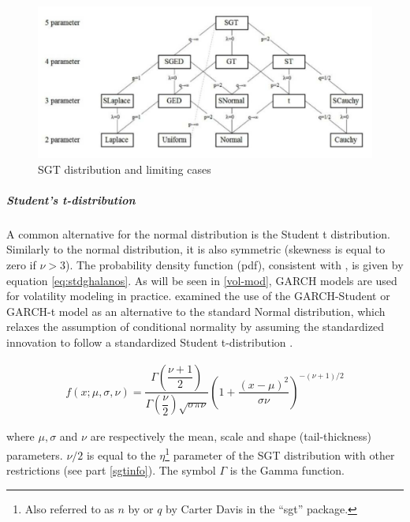 \documentclass[a4paper, nobind]{templates/ociamthesis}
\begin{document}
\begin{figure}

{\centering \includegraphics[width=1\linewidth]{front-and-back-matter/images/SGT} 

}

\caption{SGT distribution and limiting cases}\label{fig:figure}
\end{figure}

\hypertarget{students-t-distribution}{%
\subparagraph{Student's t-distribution}\label{students-t-distribution}}

\noindent A common alternative for the normal distribution is the Student t distribution. Similarly to the normal distribution, it is also symmetric (skewness is equal to zero if \(\nu > 3\)). The probability density function (pdf), consistent with \textcite{ghalanos2020}, is given by equation \eqref{eq:stdghalanos}. As will be seen in \ref{vol-mod}, GARCH models are used for volatility modeling in practice. \textcite{bollerslev1987} examined the use of the GARCH-Student or GARCH-t model as an alternative to the standard Normal distribution, which relaxes the assumption of conditional normality by assuming the standardized innovation to follow a standardized Student t-distribution \autocite{bollerslev2008}.

\begin{align}
f(x; \mu, \sigma,\nu) = \dfrac{\Gamma(\dfrac{\nu+1}{2})}{\Gamma(\dfrac{\nu}{2})\sqrt{\sigma \pi \nu}} \left(1+\dfrac{(x-\mu)^2}{\sigma \nu}\right)^{-(\nu+1)/2}
 \label{eq:stdghalanos}
\end{align}

\noindent where \(\mu, \sigma\) and \(\nu\) are respectively the mean, scale and shape (tail-thickness) parameters. \(\nu/2\) is equal to the \(\eta\)\footnote{Also referred to as \(n\) by \textcite{theodossiou1998} or \(q\) by Carter Davis in the ``sgt'' package.} parameter of the SGT distribution with other restrictions (see part \ref{sgtinfo}). The symbol \(\Gamma\) is the Gamma function.
\end{document}
